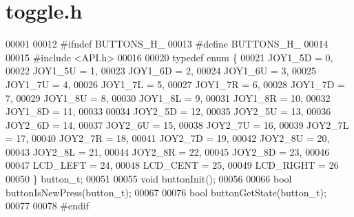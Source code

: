 \section{toggle.\+h}
\label{toggle_8h_source}

\begin{DoxyCode}
00001 
00012 \textcolor{preprocessor}{#ifndef BUTTONS\_H\_}
00013 \textcolor{preprocessor}{#define BUTTONS\_H\_}
00014 
00015 \textcolor{preprocessor}{#include <API.h>}
00016 
00020 \textcolor{keyword}{typedef} \textcolor{keyword}{enum} \{
00021     JOY1_5D = 0,
00022     JOY1_5U = 1,
00023     JOY1_6D = 2,
00024     JOY1_6U = 3,
00025     JOY1_7U = 4,
00026     JOY1_7L = 5,
00027     JOY1_7R = 6,
00028     JOY1_7D = 7,
00029     JOY1_8U = 8,
00030     JOY1_8L = 9,
00031     JOY1_8R = 10,
00032     JOY1_8D = 11,
00033 
00034     JOY2_5D = 12,
00035     JOY2_5U = 13,
00036     JOY2_6D = 14,
00037     JOY2_6U = 15,
00038     JOY2_7U = 16,
00039     JOY2_7L = 17,
00040     JOY2_7R = 18,
00041     JOY2_7D = 19,
00042     JOY2_8U = 20,
00043     JOY2_8L = 21,
00044     JOY2_8R = 22,
00045     JOY2_8D = 23,
00046 
00047     LCD_LEFT = 24,
00048     LCD_CENT = 25,
00049     LCD_RIGHT = 26
00050 \} button_t;
00051 
00055 \textcolor{keywordtype}{void} buttonInit();
00056 
00066 \textcolor{keywordtype}{bool} buttonIsNewPress(button_t);
00067 
00076 \textcolor{keywordtype}{bool} buttonGetState(button_t);
00077 
00078 \textcolor{preprocessor}{#endif}
\end{DoxyCode}
